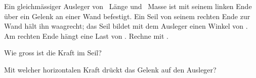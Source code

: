 Ein gleichmässiger Ausleger von \lAO\ Länge und \mAuO\ Masse ist mit seinem linken Ende über ein Gelenk an einer Wand befestigt. Ein Seil von seinem rechten Ende zur Wand hält ihn waagrecht; das Seil bildet mit dem Ausleger einen Winkel von \alO. Am rechten Ende hängt eine Last von \MLO. Rechne mit \gO.

\begin{abcliste}
\abc
Wie gross ist die Kraft im Seil?

\abc
Mit welcher horizontalen Kraft drückt das Gelenk auf den Ausleger?
\end{abcliste}
